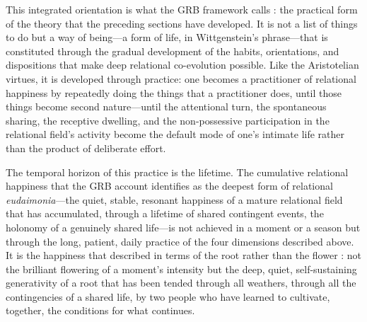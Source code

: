 This integrated orientation is what the GRB framework calls : the practical form of the theory that the preceding sections have developed. It is not a list of things to do but a way of being---a form of life, in Wittgenstein's phrase---that is constituted through the gradual development of the habits, orientations, and dispositions that make deep relational co-evolution possible. Like the Aristotelian virtues, it is developed through practice: one becomes a practitioner of relational happiness by repeatedly doing the things that a practitioner does, until those things become second nature---until the attentional turn, the spontaneous sharing, the receptive dwelling, and the non-possessive participation in the relational field's activity become the default mode of one's intimate life rather than the product of deliberate effort.

The temporal horizon of this practice is the lifetime. The cumulative relational happiness that the GRB account identifies as the deepest form of relational \emph{eudaimonia}---the quiet, stable, resonant happiness of a mature relational field that has accumulated, through a lifetime of shared contingent events, the holonomy of a genuinely shared life---is not achieved in a moment or a season but through the long, patient, daily practice of the four dimensions described above. It is the happiness that  described in terms of the root rather than the flower \parencite{paperix}: not the brilliant flowering of a moment's intensity but the deep, quiet, self-sustaining generativity of a root that has been tended through all weathers, through all the contingencies of a shared life, by two people who have learned to cultivate, together, the conditions for what continues.
